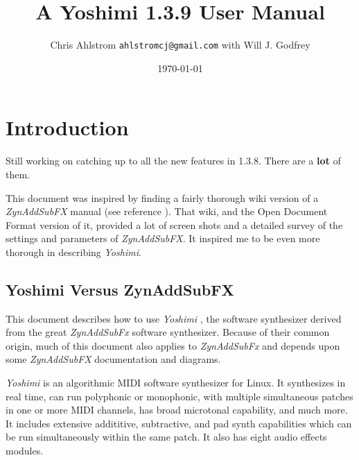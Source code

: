 \documentclass[
 11pt,
 twoside,
 a4paper,
 headinclude,
 footinclude,
 final                                 %
]{article}
\begin{document}
\title{A Yoshimi 1.3.9 User Manual}
\author{Chris Ahlstrom \texttt{ahlstromcj@gmail.com} with Will J. Godfrey}
\date{\today}
\maketitle
\tableofcontents
\listoffigures                         %
\listoftables                          %


\setlength{\parindent}{0pt}
\setlength{\parskip}{1ex plus 0.5ex minus 0.2ex}

\section{Introduction}
\label{sec:introduction}

   Still working on catching up to all the new features in 1.3.8.
   There are a \textbf{lot} of them.

   This document was inspired by finding a fairly thorough wiki version of a
   \textsl{ZynAddSubFX} manual (see reference \cite{zynwiki}).  That wiki,
   and the Open Document Format version of it, provided a lot of screen
   shots and a detailed survey of the settings and parameters of
   \textsl{ZynAddSubFX}.  It inspired me to be even more thorough in
   describing \textsl{Yoshimi}.

\subsection{Yoshimi Versus ZynAddSubFX}
\label{subsec:introduction_yoshimi_vs_zyn}

   This document describes how to use \textsl{Yoshimi} \cite{yoshimi},
   the software synthesizer derived from the great
   \textsl{ZynAddSubFx} \cite{zynaddsubfx} software
   synthesizer.  Because of their common origin, much of this document also
   applies to \textsl{ZynAddSubFx} and depends upon some \textsl{ZynAddSubFX}
   documentation and diagrams.

   \textsl{Yoshimi} is an algorithmic MIDI software synthesizer for Linux.
   It synthesizes in real time, can run polyphonic or monophonic, with multiple
   simultaneous patches in one or more MIDI channels, has broad microtonal
   capability, and much more. It includes extensive addititive, subtractive,
   and pad synth capabilities which can be run simultaneously within the
   same patch.  It also has eight audio effects modules.
\end{document}
